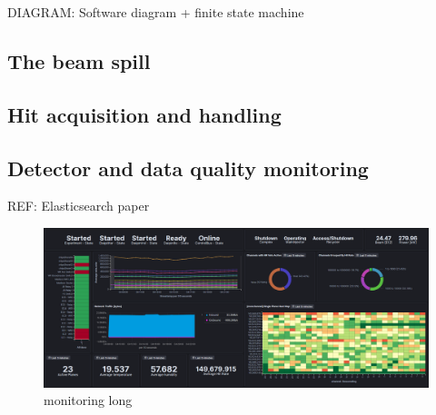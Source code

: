 DIAGRAM: Software diagram + finite state machine

\subsection{The beam spill} %
\label{sec:daq_soft_spill} %

\subsection{Hit acquisition and handling} %
\label{sec:daq_soft_hits} %

\subsection{Detector and data quality monitoring} %
\label{sec:daq_soft_monitor} %

REF: Elasticsearch paper

\begin{figure} %
    \includegraphics[width=\textwidth]{diagrams/5-daq/monitoring.png}
    \caption[monitoring short]
    {monitoring long}
    \label{fig:monitoring}
\end{figure}